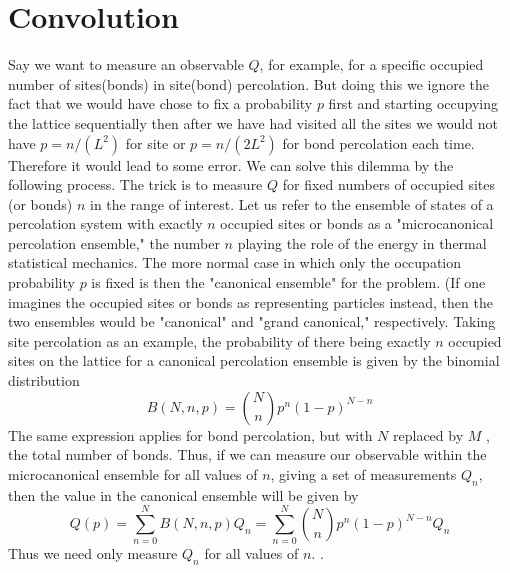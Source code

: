 


\chapter{Convolution}
\label{appendix.convolution}
Say we want to measure an observable $Q$, for example, for a specific occupied number of sites(bonds) in site(bond) percolation. But doing this we ignore the fact that we would have chose to fix a probability $p$ first and starting occupying the lattice sequentially then after we have had visited all the sites we would not have $p=n/(L^2)$ for site or $p=n/(2 L^2)$ for bond percolation each time. Therefore it would lead to some error. We can solve this dilemma by the following process. 
The trick \cite{Hu1992, Gould2006} is to measure $Q$ for fixed numbers of occupied sites (or bonds) $n$ in the range of interest. Let us refer to the ensemble of states of a percolation system with exactly $n$ occupied sites or bonds as a "microcanonical percolation ensemble," the number $n$ playing the role of the energy in thermal statistical mechanics. The more normal case in which only the occupation probability $p$ is fixed is then the "canonical ensemble" for the problem. (If one imagines the occupied sites or bonds as representing particles instead, then the two ensembles would be "canonical" and "grand canonical," respectively. Taking site
percolation as an example, the probability of there being
exactly $n$ occupied sites on the lattice for a canonical percolation ensemble is given by the binomial distribution
	\begin{equation}
		B(N,n,p) = {N\choose n} p^n (1-p)^{N-n}
	\end{equation}
	The same expression applies for bond percolation, but
	with $N$ replaced by $M$ , the total number of bonds.	Thus, if we can measure our observable within the microcanonical ensemble for all values of $n$, giving a set
	of measurements ${Q_n}$, then the value in the canonical
	ensemble will be given by
	\begin{equation}
		Q(p) 
		= \sum_{n=0}^{N} B(N,n,p) Q_n 
		= \sum_{n=0}^{N} {N\choose n} p^n(1-p)^{N-n} Q_n 	
	\end{equation}
	Thus we need only measure $Q_n$ for all values of $n$.
	\cite{Newman2001}.
	

